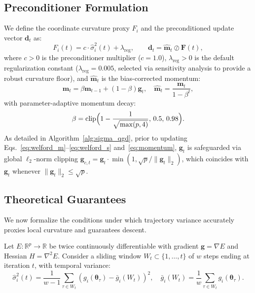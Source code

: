 \documentclass[11pt,a4paper]{article}
\begin{document}
\subsection{Preconditioner Formulation}
We define the coordinate curvature proxy $F_i$ and the preconditioned update vector $\mathbf{d}_t$ as:
\begin{equation}
F_i(t) = c \cdot \hat{\sigma}_i^2(t) + \lambda_{\text{reg}}, \qquad \mathbf{d}_t = \hat{\mathbf{m}}_t \oslash \mathbf{F}(t),
\label{eq:preconditioned_update}
\end{equation}
where $c > 0$ is the preconditioner multiplier ($c = 1.0$), $\lambda_{\text{reg}} > 0$ is the default regularization constant ($\lambda_{\text{reg}} = 0.005$, selected via sensitivity analysis to provide a robust curvature floor), and $\hat{\mathbf{m}}_t$ is the bias-corrected momentum:
\begin{equation}
\mathbf{m}_t = \beta \mathbf{m}_{t-1} + (1-\beta)\mathbf{g}_t, \quad \hat{\mathbf{m}}_t = \frac{\mathbf{m}_t}{1 - \beta^t},
\label{eq:momentum}
\end{equation}
with parameter-adaptive momentum decay:
\begin{equation}
\beta = \operatorname{clip}\Bigl(1 - \frac{1}{\sqrt{\max(p, 4)}}, \, 0.5, \, 0.98\Bigr).
\label{eq:beta_formula}
\end{equation}
As detailed in Algorithm~\ref{alg:sigma_qgd}, prior to updating Eqs.~\eqref{eq:welford_m}--\eqref{eq:welford_s} and~\eqref{eq:momentum}, $\mathbf{g}_t$ is safeguarded via global $\ell_2$-norm clipping $\mathbf{g}_{c,t} = \mathbf{g}_t \cdot \min(1, \sqrt{p}/\|\mathbf{g}_t\|_2)$, which coincides with $\mathbf{g}_t$ whenever $\|\mathbf{g}_t\|_2 \le \sqrt{p}$.

\subsection{Theoretical Guarantees}
We now formalize the conditions under which trajectory variance accurately proxies local curvature and guarantees descent.

Let $E: \mathbb{R}^p \to \mathbb{R}$ be twice continuously differentiable with gradient $\mathbf{g} = \nabla E$ and Hessian $H = \nabla^2 E$. Consider a sliding window $W_t \subset \{1, \dots, t\}$ of $w$ steps ending at iteration $t$, with temporal variance:
\begin{equation}
\hat{\sigma}_i^2(t) = \frac{1}{w-1} \sum_{\tau \in W_t} \left( g_i(\boldsymbol{\theta}_\tau) - \bar{g}_i(W_t) \right)^2, \quad \bar{g}_i(W_t) = \frac{1}{w} \sum_{\tau \in W_t} g_i(\boldsymbol{\theta}_\tau).
\end{equation}
\end{document}
